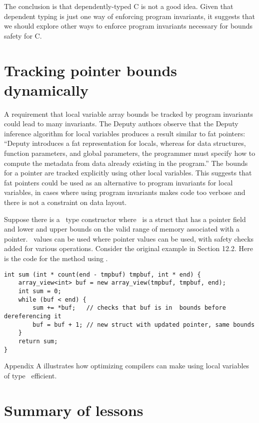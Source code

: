 The conclusion is that dependently-typed C is not a good idea. Given
that dependent typing is just one way of enforcing program invariants,
it suggests that we should explore other ways to enforce program
invariants necessary for bounds safety for C.

\section{Tracking pointer bounds dynamically}\label{tracking-pointer-bounds-dynamically}

A requirement that local variable array bounds be tracked by program
invariants could lead to many invariants. The Deputy authors observe
that the Deputy inference algorithm for local variables produces a
result similar to fat pointers: ``Deputy introduces a fat representation
for locals, whereas for data structures, function parameters, and global
parameters, the programmer must specify how to compute the metadata from
data already existing in the program.'' The bounds for a pointer are
tracked explicitly using other local variables. This suggests that fat
pointers could be used as an alternative to program invariants for local
variables, in cases where using program invariants makes code too
verbose and there is not a constraint on data layout.

Suppose there is a \arrayview\ type constructor where
\arrayview\ is a struct that has a pointer field and lower and
upper bounds on the valid range of memory associated with a pointer.
\arrayview\ values can be used where pointer values can be
used, with safety checks added for various operations. Consider the
original example in Section 12.2. Here is the code for the method using
\arrayview .

\begin{verbatim}
int sum (int * count(end - tmpbuf) tmpbuf, int * end) {
    array_view<int> buf = new array_view(tmpbuf, tmpbuf, end);
    int sum = 0;
    while (buf < end) {
        sum += *buf;   // checks that buf is in  bounds before dereferencing it        
        buf = buf + 1; // new struct with updated pointer, same bounds
    }
    return sum;
}
\end{verbatim}

Appendix A illustrates how optimizing compilers can make using local
variables of type \arrayview\ efficient.

\section{Summary of lessons}\label{summary-of-lessons}

